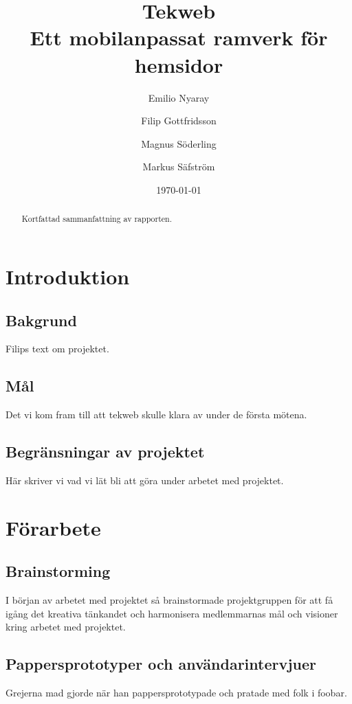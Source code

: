 \documentclass[11pt,a4paper]{report}
\title{Tekweb \\ \large{Ett mobilanpassat ramverk för hemsidor}}
\author{Emilio Nyaray      \and
        Filip Gottfridsson \and
        Magnus Söderling   \and
        Markus Säfström
}
\date{\today}
\begin{document}
\maketitle

\begin{abstract}
Kortfattad sammanfattning av rapporten.
\end{abstract}

\tableofcontents
\newpage

\chapter{Introduktion}
\section{Bakgrund}
Filips text om projektet.

\section{Mål}
Det vi kom fram till att tekweb skulle klara av under de första mötena.

\section{Begränsningar av projektet}
Här skriver vi vad vi lät bli att göra under arbetet med projektet.

\chapter{Förarbete}
\section{Brainstorming}
I början av arbetet med projektet så brainstormade projektgruppen för
att få igång det kreativa tänkandet och harmonisera medlemmarnas mål och
visioner kring arbetet med projektet.



\section{Pappersprototyper och användarintervjuer}
Grejerna mad gjorde när han pappersprototypade och pratade med folk i
foobar.
\end{document}
